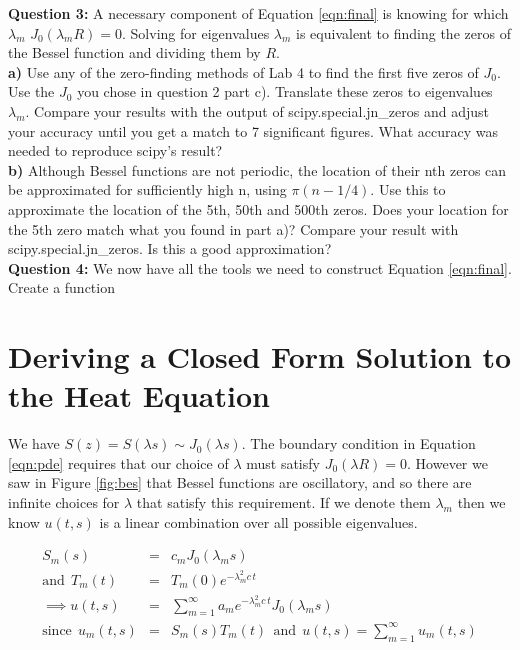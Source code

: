 \documentclass[a4paper,12pt]{article}
\begin{document}
\textbf{Question 3:} A necessary component of Equation \ref{eqn:final} is knowing for which $\lambda_m$ $J_0(\lambda_m R) = 0$. Solving for eigenvalues $\lambda_m$ is equivalent to finding the zeros of the Bessel function and dividing them by $R$.\\
\textbf{a)} Use any of the zero-finding methods of Lab 4 to find the first five zeros of $J_0$. Use the $J_0$ you chose in question 2 part c). Translate these zeros to eigenvalues $\lambda_m$. Compare your results with the output of scipy.special.jn\_zeros and adjust your accuracy until you get a match to 7 significant figures. What accuracy was needed to reproduce scipy's result?\\
\textbf{b)} Although Bessel functions are not periodic, the location of their nth zeros can be approximated for sufficiently high n, using $\pi\left(n-1/4\right)$. Use this to approximate the location of the 5th, 50th and 500th zeros. Does your location for the 5th zero match what you found in part a)? Compare your result with scipy.special.jn\_zeros. Is this a good approximation?  \\

\textbf{Question 4:} We now have all the tools we need to construct Equation \ref{eqn:final}. Create a function 


\appendix

\section{Deriving a Closed Form Solution to the Heat Equation}
\label{app:deriv}

We have $S(z) = S(\lambda s) \sim J_0(\lambda s)$. The boundary condition in Equation \ref{eqn:pde} requires that our choice of $\lambda$ must satisfy $J_0(\lambda R) = 0$. However we saw in Figure \ref{fig:bes} that Bessel functions are oscillatory, and so there are infinite choices for $\lambda$ that satisfy this requirement. If we denote them $\lambda_m$ then we know $u(t,s)$ is a linear combination over all possible eigenvalues.

\begin{eqnarray}
S_m(s) &=& c_m J_0(\lambda_m s)\nonumber\\
\mathrm{and}\:\: T_m(t) &=& T_m(0)e^{-\lambda_m^2 c\,t}\nonumber\\
\implies u(t,s) &=& \sum_{m=1}^{\infty}a_m e^{-\lambda_m^2 c\,t} J_0(\lambda_m s)\nonumber\\
\mathrm{since}\:\: u_m(t,s) &=& S_m(s)T_m(t)\:\:\mathrm{and}\:\: u(t,s) = \sum_{m=1}^{\infty}u_m(t,s)\nonumber 
\end{eqnarray}
\end{document}
